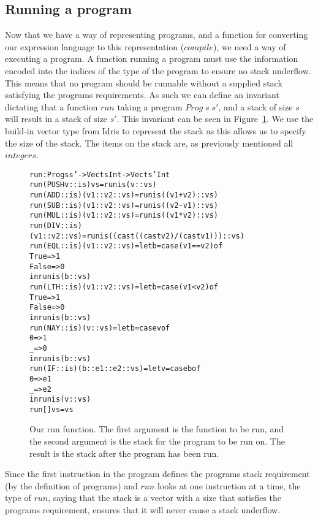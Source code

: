 \subsection{Running a program}
\label{sec:running_a_program}
Now that we have a way of representing programs, and a function for converting our expression language to this representation ($compile$), we need a way of executing a program. A function running a program must use the information encoded into the indices of the type of the program to ensure no stack underflow. This means that no program should be runnable without a supplied stack satisfying the programs requirements. As such we can define an invariant dictating that a function $run$ taking a program $Prog\;s\;s'$, and a stack of size $s$ will result in a stack of size $s'$. This invariant can be seen in Figure~\ref{fig:run_function}. We use the build-in vector type from Idris to represent the stack as this allows us to specify the size of the stack. The items on the stack are, as previously mentioned all $integers$. 

\begin{figure}
\begin{alltt}
run : Prog s s' -> Vect s Int -> Vect s' Int
run (PUSH v :: is) vs               = run is (v :: vs)
run (ADD    :: is) (v1 :: v2 :: vs) = run is ((v1 + v2) :: vs)
run (SUB    :: is) (v1 :: v2 :: vs) = run is ((v2 - v1) :: vs)
run (MUL    :: is) (v1 :: v2 :: vs) = run is ((v1 * v2) :: vs)
run (DIV    :: is) (v1 :: v2 :: vs) = run is ((cast ((cast v2) / (cast v1))) :: vs)
run (EQL    :: is) (v1 :: v2 :: vs) = let b = case (v1 == v2) of
                                                   True  => 1
                                                   False => 0
                                              in run is (b :: vs)
run (LTH    :: is) (v1 :: v2 :: vs) = let b = case (v1 < v2) of
                                                   True  => 1
                                                   False => 0
                                              in run is (b :: vs)
run (NAY    :: is)        (v :: vs) = let b = case v of
                                                   0 => 1
                                                   _ => 0
                                              in run is (b :: vs)
run (IF     :: is)        (b :: e1 :: e2 :: vs) = let v = case b of
                                                   0 => e1
                                                   _ => e2
                                              in run is (v :: vs)
run []             vs                 = vs
\end{alltt}
\caption{Our run function. The first argument is the function to be run, and the second argument is the stack for the program to be run on. The result is the stack after the program has been run.}
\label{fig:run_function}
\end{figure}

Since the first instruction in the program defines the programs stack requirement (by the definition of programs) and $run$ looks at one instruction at a time, the type of $run$, saying that the stack is a vector with a size that satisfies the programs requirement, ensures that it will never cause a stack underflow.
